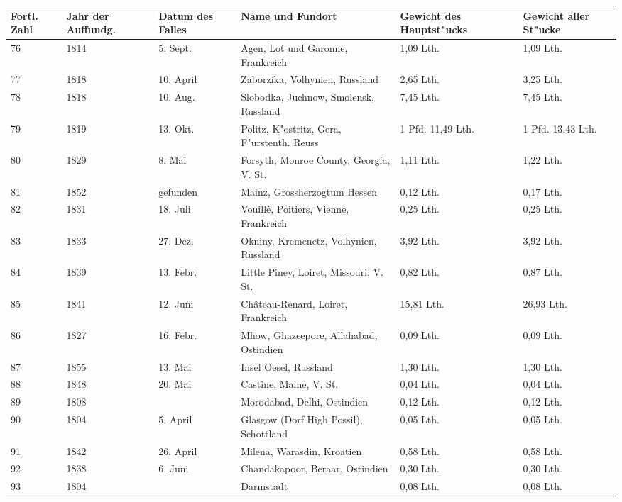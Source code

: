\documentclass[a4paper, 11pt, oneside, german]{article}
\begin{document}
\begin{center}
\begin{footnotesize}
\begin{tabular}{ |p{7mm}|p{7mm}|p{13mm}|p{48mm}|p{22mm}|p{22mm}| }
    \hline
    Fortl. Zahl & Jahr der Auffundg. & Datum des Falles & Name und Fundort & Gewicht des Hauptst"ucks & Gewicht aller St"ucke\\
    \hline\hline
    76 & 1814 & 5. Sept. & Agen, Lot und Garonne, Frankreich & 1,09 Lth. & 1,09 Lth.\\\hline
    77 & 1818 & 10. April & Zaborzika, Volhynien, Russland & 2,65 Lth. & 3,25 Lth.\\\hline
    78 & 1818 & 10. Aug. & Slobodka, Juchnow, Smolensk, Russland & 7,45 Lth. & 7,45 Lth.\\\hline
    79 & 1819 & 13. Okt. & Politz, K"ostritz, Gera, F"urstenth. Reuss & 1 Pfd. 11,49 Lth. & 1 Pfd. 13,43 Lth.\\\hline
    80 & 1829 & 8. Mai & Forsyth, Monroe County, Georgia, V. St. & 1,11 Lth. & 1,22 Lth.\\\hline
    81 & 1852 & gefunden & Mainz, Grossherzogtum Hessen & 0,12 Lth. & 0,17 Lth.\\\hline
    82 & 1831 & 18. Juli & Vouillé, Poitiers, Vienne, Frankreich & 0,25 Lth. & 0,25 Lth.\\\hline
    83 & 1833 & 27. Dez. & Okniny, Kremenetz, Volhynien, Russland & 3,92 Lth. & 3,92 Lth.\\\hline
    84 & 1839 & 13. Febr. & Little Piney, Loiret, Missouri, V. St. & 0,82 Lth. & 0,87 Lth.\\\hline
    85 & 1841 & 12. Juni & Château-Renard, Loiret, Frankreich & 15,81 Lth. & 26,93 Lth.\\\hline
    86 & 1827 & 16. Febr. & Mhow, Ghazeepore, Allahabad, Ostindien & 0,09 Lth. & 0,09 Lth.\\\hline
    87 & 1855 & 13. Mai & Insel Oesel, Russland & 1,30 Lth. & 1,30 Lth.\\\hline
    88 & 1848 & 20. Mai & Castine, Maine, V. St. & 0,04 Lth. & 0,04 Lth.\\\hline
    89 & 1808 &  & Morodabad, Delhi, Ostindien & 0,12 Lth. & 0,12 Lth.\\\hline
    90 & 1804 & 5. April & Glasgow (Dorf High Possil), Schottland & 0,05 Lth. & 0,05 Lth.\\\hline
    91 & 1842 & 26. April & Milena, Warasdin, Kroatien & 0,58 Lth. & 0,58 Lth.\\\hline
    92 & 1838 & 6. Juni & Chandakapoor, Beraar, Ostindien & 0,30 Lth. & 0,30 Lth.\\\hline
    93 & 1804 &  & Darmstadt & 0,08 Lth. & 0,08 Lth.\\
    \hline
\end{tabular}
\end{footnotesize}
\end{center}
\end{document}
